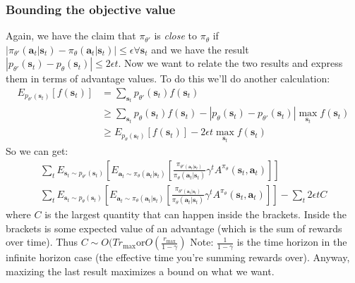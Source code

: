 \documentclass{report}
\begin{document}
\subsubsection{Bounding the objective value}
Again, we have the claim that 
$ \pi_{ \theta' }  $ is \textit{close} to $ \pi_{ \theta }  $ if $ \left| \pi_{ \theta' } (\bm{a}_{t}| \bm{s}_{t} ) - \pi_{ \theta } (\bm{a}_{t}| \bm{s}_{t} ) \right|
\leq \epsilon \forall \bm{s}_{t} $
and we have the result $ \left| p_{ \theta' } (\bm{s}_{t}) - p_{ \theta } (\bm{s}_{t}) \right| \leq 2 \epsilon t  $.
Now we want to relate the two results and express them in terms of advantage values.
To do this we'll do another calculation:
\begin{align}
		E_{ p_{ \theta' } (\bm{s}_{t}) } \left[ f(\bm{s}_{t}) \right] &=
		\sum_{\bm{s}_{t}}^{} p_{ \theta' } (\bm{s}_{t}) f (\bm{s}_{t}) \\
	  &\geq
		\sum_{\bm{s}_{t}}^{} p_{ \theta } (\bm{s}_{t}) f (\bm{s}_{t}) - \left| p_{ \theta } (\bm{s}_{t}) - p_{ \theta' } (\bm{s}_{t}) \right| \max_{\bm{s}_{t}} f (\bm{s}_{t}) \\
	  &\geq
	  E_{ p_{ \theta } (\bm{s}_{t}) } \left[ f (\bm{s}_{t}) \right] - 2 \epsilon t \max_{\bm{s}_{t}} f (\bm{s}_{t})
\end{align}
So we can get:
\begin{gather}
\sum_{t}^{} E_{ \bm{s}_{t} \sim p_{ \theta' } (\bm{s}_{t}) }
\left[ 
E_{ \bm{a}_{t}\sim \pi_{ \theta } (\bm{a}_{t}| \bm{s}_{t} ) }
\left[ \frac{\pi_{ \theta' (\bm{a}_{t}| \bm{s}_{t} ) }}{\pi_{ \theta }(\bm{a}_{t}| \bm{s}_{t} )} \gamma^{ t }A^{ \pi_{ \theta } } (\bm{s}_{t}, \bm{a}_{t} )  \right] 
\right] \\
\sum_{t}^{} E_{ \bm{s}_{t} \sim p_{ \theta } (\bm{s}_{t}) }
\left[ 
E_{ \bm{a}_{t}\sim \pi_{ \theta } (\bm{a}_{t}| \bm{s}_{t} ) }
\left[ \frac{\pi_{ \theta' (\bm{a}_{t}| \bm{s}_{t} ) }}{\pi_{ \theta }(\bm{a}_{t}| \bm{s}_{t} )} \gamma^{ t }A^{ \pi_{ \theta } } (\bm{s}_{t}, \bm{a}_{t} )  \right] 
\right] 
- \sum_{t}^{} 2 \epsilon t C
\end{gather}
where $ C  $ is the largest quantity that can happen inside the brackets.
Inside the brackets is some expected value of an advantage (which is the sum of rewards over time).
Thus $ C \sim O(T r_{ \text{max} }  \text{or} O(\frac{r_{ \text{max} }}{1 - \gamma} ) $ 
Note: $ \frac{1}{1 - \gamma}   $ is the time horizon in the infinite horizon case (the effective time
you're summing rewards over).
Anyway, maxizing the last result maximizes a bound on what we want.
\end{document}
